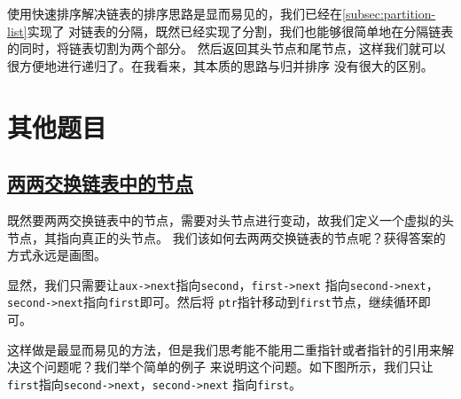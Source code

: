 \documentclass[../../main.tex]{subfiles}
\begin{document}


\begin{kaobox}[title=快速排序]
  使用快速排序解决链表的排序思路是显而易见的，我们已经在\ref{subsec:partition-list}实现了
  对链表的分隔，既然已经实现了分割，我们也能够很简单地在分隔链表的同时，将链表切割为两个部分。
  然后返回其头节点和尾节点，这样我们就可以很方便地进行递归了。在我看来，其本质的思路与归并排序
  没有很大的区别。
\end{kaobox}

\section{其他题目}

\subsection{\href{https://leetcode.cn/problems/swap-nodes-in-pairs/}{两两交换链表中的节点}}

既然要两两交换链表中的节点，需要对头节点进行变动，故我们定义一个虚拟的头节点，其指向真正的头节点。
我们该如何去两两交换链表的节点呢？获得答案的方式永远是画图。


显然，我们只需要让\texttt{aux->next}指向\texttt{second}，\texttt{first->next}
指向\texttt{second->next}，\texttt{second->next}指向\texttt{first}即可。然后将
\texttt{ptr}指针移动到\texttt{first}节点，继续循环即可。

这样做是最显而易见的方法，但是我们思考能不能用二重指针或者指针的引用来解决这个问题呢？我们举个简单的例子
来说明这个问题。如下图所示，我们只让\texttt{first}指向\texttt{second->next}，\texttt{second->next}
指向\texttt{first}。
\end{document}
